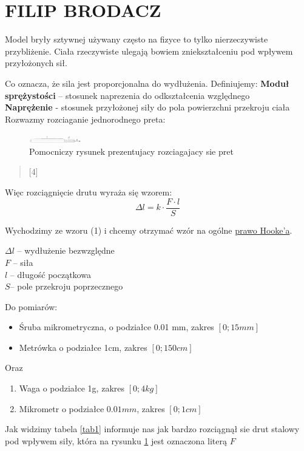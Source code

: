 
\section{FILIP BRODACZ}

Model bryły sztywnej używany często na fizyce to tylko nierzeczywiste przybliżenie. Ciała rzeczywiste ulegają bowiem zniekształceniu pod wpływem przyłożonych sił.

	
Co oznacza, że sila jest proporcjonalna do wydłużenia. Definiujemy:
	\textbf{Moduł sprężystości} – stosunek naprezenia  do odkształcenia względnego\\
	\textbf{Naprężenie} - stosunek przyłożonej siły do pola powierzchni przekroju ciała\\


Rozwazmy rozciaganie jednorodnego preta:
\begin{figure}[htbp]
    \centering
    \includegraphics[width=0.2\textwidth]{pictures/pret.jpg}
    \caption{Pomocniczy rysunek prezentujacy rozciagajacy sie pret}
    \label{rys1}
\end{figure}

\begin{quote}
     [4] 
\end{quote}
Więc rozciągnięcie drutu wyraża się wzorem: 
\begin{equation}\label{eq1}
 \Delta l = k \cdot \frac{F \cdot l}{S}
\end{equation}

Wychodzimy ze wzoru (1) i chcemy otrzymać wzór na ogólne \underline{prawo Hooke’a}.
\begin{center}
$ \Delta l $ – wydłużenie bezwzględne \\
$F$ – siła \\
$l$ – długość początkowa\\
$S$– pole przekroju poprzecznego\\
\end{center}

\newpage
Do pomiarów:

\begin{itemize}
    \item Śruba mikrometryczna, o podziałce 0.01 mm, zakres $\left[0;15mm\right]$
    \item Metrówka o podziałce 1cm, zakres $\left[0;150cm\right]$
\end{itemize}

Oraz

\begin{enumerate}
    \item Waga o podziałce 1g, zakres $\left[0;4kg\right]$
    \item Mikrometr o podziałce $0.01mm$, zakres $\left[0;1cm\right]$
\end{enumerate}



Jak widzimy tabela \ref{tab1} informuje nas jak bardzo rozciągnął sie drut stalowy pod wpływem siły, która na rysunku \ref{rys1} jest oznaczona literą $F$